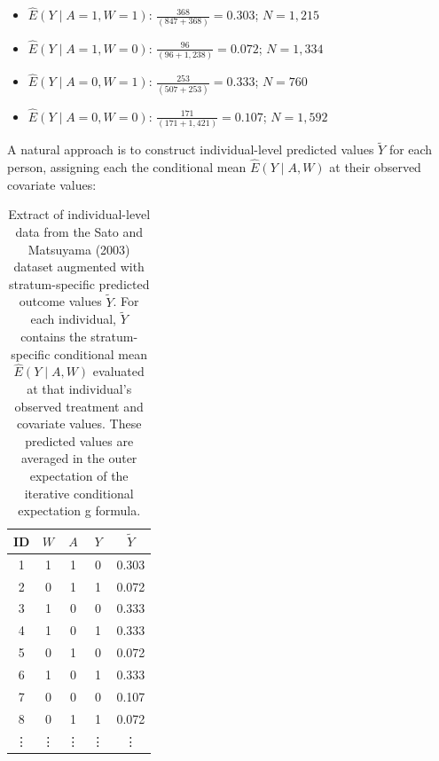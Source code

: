 \documentclass[12pt]{article}
\numberwithin{equation}{section}
\begin{document}
\begin{itemize}
  \item[] $\hat{E}(Y \mid A = 1, W = 1)$: $\frac{368}{(847+368)} = 0.303$; $N = 1{,}215$
  \item[] $\hat{E}(Y \mid A = 1, W = 0)$: $\frac{96}{(96+1{,}238)} = 0.072$; $N = 1{,}334$
  \item[] $\hat{E}(Y \mid A = 0, W = 1)$: $\frac{253}{(507+253)} = 0.333$; $N = 760$
  \item[] $\hat{E}(Y \mid A = 0, W = 0)$: $\frac{171}{(171+1{,}421)} = 0.107$; $N = 1{,}592$
\end{itemize}


A natural approach is to construct individual-level predicted values $\widetilde{Y}$ for each person, assigning each the conditional mean $\hat{E}(Y\mid A,W)$ at their observed covariate values:

\begin{table}[h]
\centering
\begin{tabular}{ccccc}
\toprule
ID &  $W$ & $A$ & $Y$ & $\widetilde{Y}$ \\
\midrule
1 & 1 & 1 & 0 &  0.303\\
2 & 0 & 1 & 1 &  0.072\\
3 & 1 & 0 & 0 &  0.333\\
4 & 1 & 0 & 1 &  0.333\\
5 & 0 & 1 & 0 &  0.072\\
6 & 1 & 0 & 1 &  0.333\\
7 & 0 & 0 & 0 &  0.107\\
8 & 0 & 1 & 1 &  0.072\\
\vdots & \vdots &  \vdots & \vdots &  \vdots \\
\bottomrule
\end{tabular}
\caption{Extract of individual-level data from the Sato and Matsuyama (2003) dataset augmented with stratum-specific predicted outcome values $\widetilde{Y}$. For each individual, $\widetilde{Y}$ contains the stratum-specific conditional mean $\hat{E}(Y \mid A, W)$ evaluated at that individual's observed treatment and covariate values. These predicted values are averaged in the outer expectation of the iterative conditional expectation g formula.}
\label{tab:ice_illustration}
\end{table}
\end{document}
